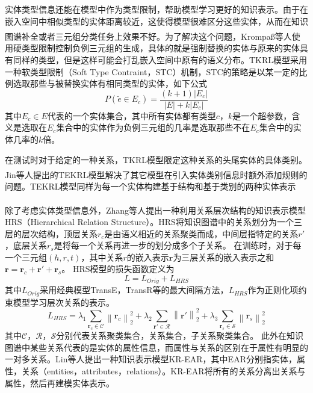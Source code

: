 \documentclass[twocolumn]{article}
\newcommand{\upcite}[1]{\textsuperscript{\textsuperscript{\cite{#1}}}}
\begin{document}
	实体类型信息还能在模型中作为类型限制，帮助模型学习更好的知识表示。由于在嵌入空间中相似类型的实体距离较近，这使得模型很难区分这些实体，从而在知识图谱补全或者三元组分类任务上效果不好。为了解决这个问题，Krompaß等人\upcite{typeconstrain}使用硬类型限制控制负例三元组的生成，具体的就是强制替换的实体与原来的实体具有同样的类型，但是这样可能会打乱嵌入空间中原有的语义分布。TKRL模型采用一种软类型限制（Soft Type Contraint，STC）机制，STC的策略是以某一定的比例选取那些与被替换实体有相同类型的实体，如下公式
	\begin{equation}
		P(\widetilde{e}\in E_c)=\frac{(k+1)\left | E_c \right |}{\left | E \right |+k\left | E_c \right |}
	\end{equation}
	其中$E_c\in E$代表的一个实体集合，其中所有实体都有类型$c$，$k$是一个超参数，含义是选取在$E_c$集合中的实体作为负例三元组的几率是选取那些不在$E_c$集合中的实体几率的$k$倍。
	
	在测试时对于给定的一种关系，TKRL模型限定这种关系的头尾实体的具体类别。Jin等人\upcite{TEKRL}提出的TEKRL模型解决了其它模型在引入实体类别信息时额外添加规则的问题。TEKRL模型同样为每一个实体构建基于结构和基于类别的两种实体表示
	
	除了考虑实体类型信息外，Zhang等人\upcite{HRS}提出一种利用关系层次结构的知识表示模型HRS（Hierarchical Relation Structure）。HRS将知识图谱中的关系划分为一个三层的层次结构，顶层关系$r_c$是由语义相近的关系聚类而成，中间层指特定的关系$r'$，底层关系$r_s$是将每一个关系再进一步的划分成多个子关系。
	在训练时，对于每一个三元组$(h,r,t)$，其中关系$r$的嵌入表示$\textbf{r}$为三层关系的嵌入表示之和
	$\textbf{r}=\textbf{r}_c+\textbf{r}'+\textbf{r}_s$。
	HRS模型的损失函数定义为
	\begin{equation}
		L=L_{Orig}+L_{HRS}
	\end{equation}
	其中$L_{Orig}$采用经典模型TransE，TransR等的最大间隔方法，$L_{HRS}$作为正则化项约束模型学习层次关系的表示。
	\begin{equation}
		L_{HRS}=\lambda_1\sum_{\textbf{r}_c\in \mathcal{C}}\left \| \textbf{r}_c \right \|_2^2+\lambda_2\sum_{\textbf{r}'\in \mathcal{R}}\left \| \textbf{r}' \right \|_2^2+\lambda_3\sum_{\textbf{r}_s\in\mathcal{S}}\left \| \textbf{r}_s \right \|_2^2
	\end{equation}
	其中$\mathcal{C}$，$\mathcal{R}$，$\mathcal{S}$分别代表关系聚类集合，关系集合，子关系聚类集合。
	此外在知识图谱中某些关系代表的是实体的属性信息，而属性与关系的区别在于属性有明显的一对多关系。Lin等人提出一种知识表示模型KR-EAR，其中EAR分别指实体，属性，关系（entities，attributes，relations）。KR-EAR将所有的关系分离出关系与属性，然后再建模实体表示。
	
\end{document}

